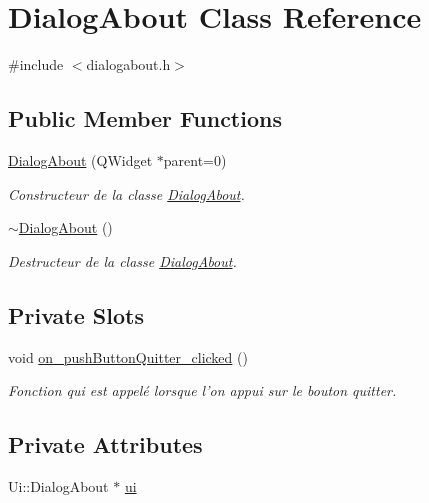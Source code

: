 \hypertarget{class_dialog_about}{\section{Dialog\-About Class Reference}
\label{class_dialog_about}
}


{\ttfamily \#include $<$dialogabout.\-h$>$}

\subsection*{Public Member Functions}
\begin{DoxyCompactItemize}
\item 
\hyperlink{class_dialog_about_a190b23e7ee6baf399a1a026c1a400e53}{Dialog\-About} (Q\-Widget $\ast$parent=0)
\begin{DoxyCompactList}\small\item\em Constructeur de la classe \hyperlink{class_dialog_about}{Dialog\-About}. \end{DoxyCompactList}\item 
\hyperlink{class_dialog_about_a0b141c358e2032f26464f7a4d85f4bd8}{$\sim$\-Dialog\-About} ()
\begin{DoxyCompactList}\small\item\em Destructeur de la classe \hyperlink{class_dialog_about}{Dialog\-About}. \end{DoxyCompactList}\end{DoxyCompactItemize}
\subsection*{Private Slots}
\begin{DoxyCompactItemize}
\item 
void \hyperlink{class_dialog_about_aaacbd49e1ed46e9861b8e78cb83b9fbb}{on\-\_\-push\-Button\-Quitter\-\_\-clicked} ()
\begin{DoxyCompactList}\small\item\em Fonction qui est appelé lorsque l'on appui sur le bouton quitter. \end{DoxyCompactList}\end{DoxyCompactItemize}
\subsection*{Private Attributes}
\begin{DoxyCompactItemize}
\item 
Ui\-::\-Dialog\-About $\ast$ \hyperlink{class_dialog_about_a8e0c8d0c6820f9f8b7f97ac625f15e2c}{ui}
\end{DoxyCompactItemize}


